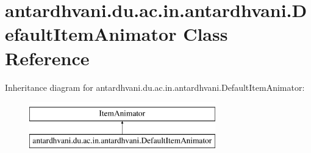\hypertarget{classantardhvani_1_1du_1_1ac_1_1in_1_1antardhvani_1_1_default_item_animator}{}\section{antardhvani.\+du.\+ac.\+in.\+antardhvani.\+Default\+Item\+Animator Class Reference}
\label{classantardhvani_1_1du_1_1ac_1_1in_1_1antardhvani_1_1_default_item_animator}
Inheritance diagram for antardhvani.\+du.\+ac.\+in.\+antardhvani.\+Default\+Item\+Animator\+:\begin{figure}[H]
\begin{center}
\leavevmode
\includegraphics[height=2.000000cm]{classantardhvani_1_1du_1_1ac_1_1in_1_1antardhvani_1_1_default_item_animator}
\end{center}
\end{figure}
